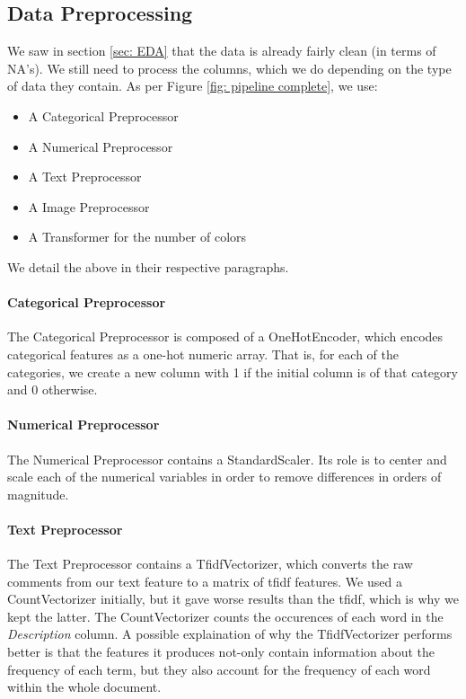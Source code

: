\documentclass[12pt]{article}
\begin{document}
\subsection{Data Preprocessing}
We saw in section \ref{sec: EDA} that the data is already fairly clean (\eg in terms of NA's). We still need to process the columns, which we do depending on the type of data they contain. As per Figure \ref{fig: pipeline complete}, we use:
\begin{itemize}
    \item A Categorical Preprocessor
    \item A Numerical Preprocessor
    \item A Text Preprocessor
    \item A Image Preprocessor
    \item A Transformer for the number of colors
\end{itemize}
We detail the above in their respective paragraphs.

\paragraph{Categorical Preprocessor} The Categorical Preprocessor is composed of a OneHotEncoder, which encodes categorical features as a one-hot numeric array. That is, for each of the categories, we create a new column with 1 if the initial column is of that category and 0 otherwise.

\paragraph{Numerical Preprocessor} The Numerical Preprocessor contains a StandardScaler. Its role is to center and scale each of the numerical variables in order to remove differences in orders of magnitude.

\paragraph{Text Preprocessor} The Text Preprocessor contains a TfidfVectorizer, which converts the raw comments from our text feature to a matrix of \gls{tfidf} features. We used a CountVectorizer initially, but it gave worse results than the \gls{tfidf}, which is why we kept the latter. The CountVectorizer counts the occurences of each word in the \textit{Description} column. A possible explaination of why the TfidfVectorizer performs better is that the features it produces not-only contain information about the frequency of each term, but they also account for the frequency of each word within the whole document.
\end{document}

